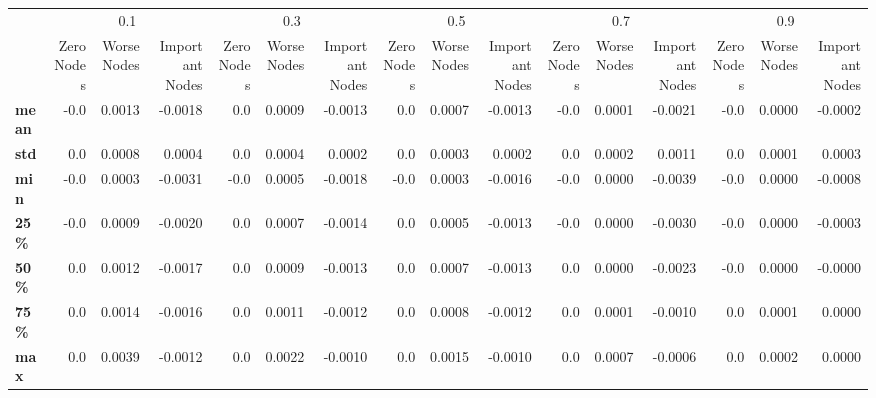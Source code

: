 \begin{tabular}{lrrrrrrrrrrrrrrr}
\toprule
{} & \multicolumn{3}{c}{0.1} & \multicolumn{3}{c}{0.3} & \multicolumn{3}{c}{0.5} & \multicolumn{3}{c}{0.7} & \multicolumn{3}{c}{0.9} \\
{} & Zero Nodes & Worse Nodes & Important Nodes & Zero Nodes & Worse Nodes & Important Nodes & Zero Nodes & Worse Nodes & Important Nodes & Zero Nodes & Worse Nodes & Important Nodes & Zero Nodes & Worse Nodes & Important Nodes \\
\midrule
\textbf{mean} &       -0.0 &      0.0013 &         -0.0018 &        0.0 &      0.0009 &         -0.0013 &        0.0 &      0.0007 &         -0.0013 &       -0.0 &      0.0001 &         -0.0021 &       -0.0 &      0.0000 &         -0.0002 \\
\textbf{std } &        0.0 &      0.0008 &          0.0004 &        0.0 &      0.0004 &          0.0002 &        0.0 &      0.0003 &          0.0002 &        0.0 &      0.0002 &          0.0011 &        0.0 &      0.0001 &          0.0003 \\
\textbf{min } &       -0.0 &      0.0003 &         -0.0031 &       -0.0 &      0.0005 &         -0.0018 &       -0.0 &      0.0003 &         -0.0016 &       -0.0 &      0.0000 &         -0.0039 &       -0.0 &      0.0000 &         -0.0008 \\
\textbf{25\% } &       -0.0 &      0.0009 &         -0.0020 &        0.0 &      0.0007 &         -0.0014 &        0.0 &      0.0005 &         -0.0013 &       -0.0 &      0.0000 &         -0.0030 &       -0.0 &      0.0000 &         -0.0003 \\
\textbf{50\% } &        0.0 &      0.0012 &         -0.0017 &        0.0 &      0.0009 &         -0.0013 &        0.0 &      0.0007 &         -0.0013 &        0.0 &      0.0000 &         -0.0023 &       -0.0 &      0.0000 &         -0.0000 \\
\textbf{75\% } &        0.0 &      0.0014 &         -0.0016 &        0.0 &      0.0011 &         -0.0012 &        0.0 &      0.0008 &         -0.0012 &        0.0 &      0.0001 &         -0.0010 &        0.0 &      0.0001 &          0.0000 \\
\textbf{max } &        0.0 &      0.0039 &         -0.0012 &        0.0 &      0.0022 &         -0.0010 &        0.0 &      0.0015 &         -0.0010 &        0.0 &      0.0007 &         -0.0006 &        0.0 &      0.0002 &          0.0000 \\
\bottomrule
\end{tabular}
